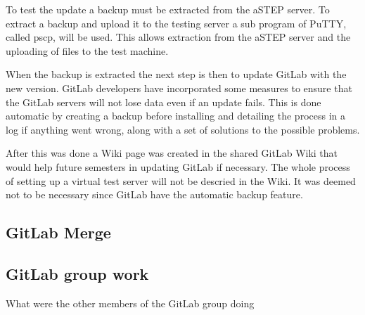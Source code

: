 
To test the update a backup must be extracted from the aSTEP server. To extract a backup and upload it to the testing server a sub program of PuTTY, called pscp, will be used. This allows extraction from the aSTEP server and the uploading of files to the test machine.

When the backup is extracted the next step is then to update GitLab with the new version. GitLab developers have incorporated some measures to ensure that the GitLab servers will not lose data even if an update fails. This is done automatic by creating a backup before installing and detailing the process in a log if anything went wrong, along with a set of solutions to the possible problems.

After this was done a Wiki page was created in the shared GitLab Wiki that would help future semesters in updating GitLab if necessary. The whole process of setting up a virtual test server will not be descried in the Wiki. It was deemed not to be necessary since GitLab have the automatic backup feature.

\subsection{GitLab Merge}

\subsection{GitLab group work}
What were the other members of the GitLab group doing


